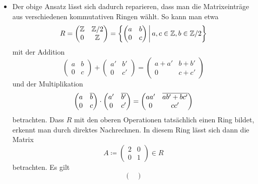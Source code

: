 \begin{itemize}
  \item
    Der obige Ansatz lässt sich dadurch reparieren, dass man die Matrixeinträge aus verschiedenen kommutativen Ringen wählt.
    So kann man etwa
    \[
        R
      = \begin{pmatrix}
          \Integer  & \Integer/2 \\
          0         & \Integer
        \end{pmatrix}
      = \left\{
          \begin{pmatrix}
            a & b \\
            0 & c
          \end{pmatrix}
        \suchthat*
          a, c \in \Integer,
          b \in \Integer/2
        \right\}
    \]
    mit der Addition
    \[
      \begin{pmatrix}
        a & b \\
        0 & c
      \end{pmatrix}
      +
      \begin{pmatrix}
        a'  & b'  \\
        0   & c'
      \end{pmatrix}
      =
      \begin{pmatrix}
        a+a'  & b+b'  \\
        0     & c+c'
      \end{pmatrix}
    \]
    und der Multiplikation
    \[
      \begin{pmatrix}
        a & \overline{b} \\
        0 & c
      \end{pmatrix}
      \cdot
      \begin{pmatrix}
        a'  & \overline{b'}  \\
        0   & c'
      \end{pmatrix}
      =
      \begin{pmatrix}
        aa' & \overline{a b' + b c'}  \\
        0   & cc'
      \end{pmatrix}
    \]
    betrachten.
    Dass $R$ mit den oberen Operationen tatsächlich einen Ring bildet, erkennt man durch direktes Nachrechnen.
    In diesem Ring lässt sich dann die Matrix
    \[
                A
      \coloneqq \begin{pmatrix}
                  2 & 0 \\
                  0 & 1
                \end{pmatrix}
      \in       R
    \]
    betrachten.
    Es gilt
    \[
        \begin{pmatrix}

\end{pmatrix}\]
\end{itemize}
